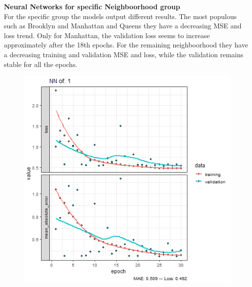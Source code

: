 \documentclass{FR16}
\begin{document}
\newpage
\noindent \textbf{Neural Networks for specific Neighboorhood group}\\
For the specific group the models output different results. The most populous such as Brooklyn and Manhattan and Queens they have a decreasing MSE and loss trend. Only for Manhattan, the validation loss seems to increase approximately after the 18th epochs. For the remaining neighboorhood they have a decreasing training and validation MSE and loss, while the validation remains stable for all the epochs.
\begin{figure}[!htb]
   \begin{minipage}{0.33\textwidth}
     \centering
     \includegraphics[width=1\linewidth]{figures/NN-1.png} 
   \end{minipage}\hfill
   \begin{minipage}{0.33\textwidth}
     \centering

\end{minipage}
\end{figure}
\end{document}
